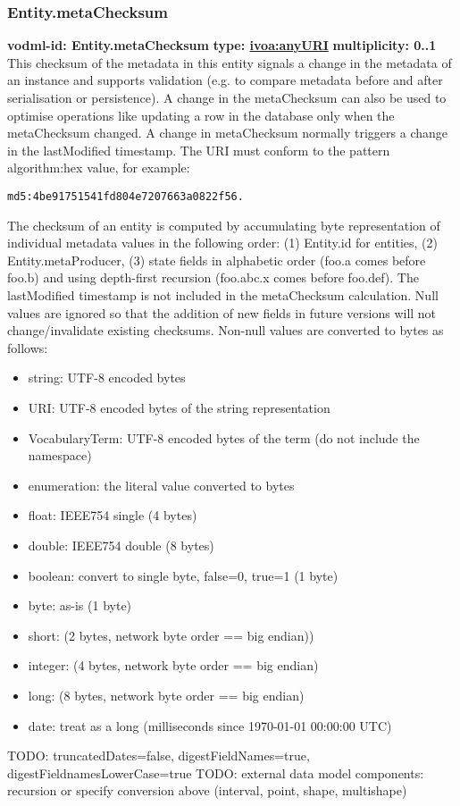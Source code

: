     \subsubsection{Entity.metaChecksum}
      \textbf{vodml-id: Entity.metaChecksum} \newline
      \textbf{type: \hyperref[sect:ivoa]{ivoa:anyURI}} \newline
      \textbf{multiplicity: 0..1} \newline
      This checksum of the metadata in this entity signals a change in the metadata of an instance and supports validation (e.g. to compare metadata before and after serialisation or persistence). A change in the metaChecksum can also be used to optimise operations like updating a row in the database only when the metaChecksum changed. A change in metaChecksum normally triggers a change in the lastModified timestamp. The URI must conform to the pattern {algorithm}:{hex value}, for example: \begin{verbatim}md5:4be91751541fd804e7207663a0822f56.\end{verbatim} The checksum of an entity is computed by accumulating byte representation of individual metadata values in the following order: (1) Entity.id for entities, (2) Entity.metaProducer, (3) state fields in alphabetic order (foo.a comes before foo.b) and using depth-first recursion (foo.abc.x comes before foo.def). The lastModified timestamp is not included in the metaChecksum calculation. Null values are ignored so that the addition of new fields in future versions will not change/invalidate existing checksums. Non-null values are converted to bytes as follows: \begin{itemize} \item string: UTF-8 encoded bytes \item URI: UTF-8 encoded bytes of the string representation \item VocabularyTerm: UTF-8 encoded bytes of the term (do not include the namespace) \item enumeration: the literal value converted to bytes \item float: IEEE754 single (4 bytes) \item double: IEEE754 double (8 bytes) \item boolean: convert to single byte, false=0, true=1 (1 byte) \item byte: as-is (1 byte) \item short: (2 bytes, network byte order == big endian)) \item integer: (4 bytes, network byte order == big endian) \item long: (8 bytes, network byte order == big endian) \item date: treat as a long (milliseconds since 1970-01-01 00:00:00 UTC) \end{itemize} TODO: truncatedDates=false, digestFieldNames=true, digestFieldnamesLowerCase=true TODO: external data model components: recursion or specify conversion above (interval, point, shape, multishape)


